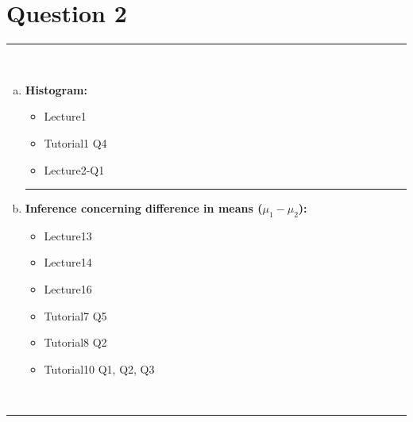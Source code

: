 \documentclass[12pt]{article}
\begin{document}
\section*{Question 2 }
\noindent\rule{\linewidth}{1pt}
\quad\\[-0.5cm]
\begin{enumerate}[a)]
\item {\bf Histogram:}
\begin{itemize}
\item Lecture1 %
\item Tutorial1 Q4
\item Lecture2-Q1
\end{itemize}
\begin{center}\noindent\rule{0.4\linewidth}{0.5pt}\end{center}
\item {\bf Inference concerning difference in means ($\mu_1-\mu_2$):}
\begin{itemize}
\item Lecture13
\item Lecture14 %
\item Lecture16 %
\item Tutorial7 Q5
\item Tutorial8 Q2
\item Tutorial10 Q1, Q2, Q3
\end{itemize}
\end{enumerate}
\quad\\[-0.3cm]
\noindent\rule{\linewidth}{1pt}

\newpage
\end{document}
